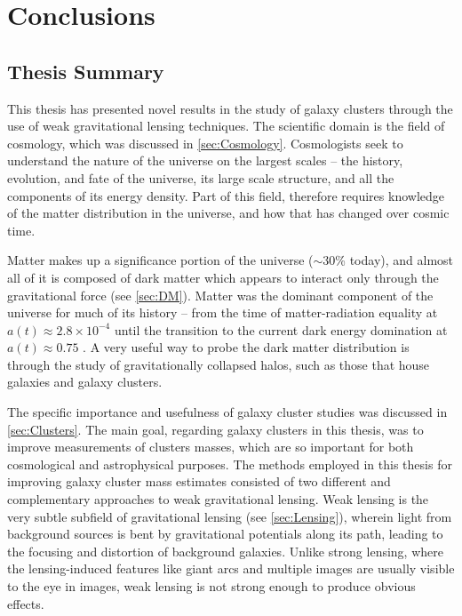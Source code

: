 
\chapter{Conclusions}
\label{ch:conc}


\section{Thesis Summary}
\label{sec:summary}

This thesis has presented novel results in the study of galaxy clusters through the use of weak gravitational lensing techniques. The scientific domain is the field of cosmology, which was discussed in \autoref{sec:Cosmology}. Cosmologists seek to understand the nature of the universe on the largest scales -- the history, evolution, and fate of the universe, its large scale structure, and all the components of its energy density. Part of this field, therefore requires knowledge of the matter distribution in the universe, and how that has changed over cosmic time. 

Matter makes up a significance portion of the universe ($\sim30$\% today), and almost all of it is composed of dark matter which appears to interact only through the gravitational force (see \autoref{sec:DM}). Matter was the dominant component of the universe for much of its history -- from the time of matter-radiation equality at $a(t) \approx 2.8 \times 10^{-4}$ until the transition to the current dark energy domination at $a(t) \approx 0.75$ \citep{RydenText}. A very useful way to probe the dark matter distribution is through the study of gravitationally collapsed halos, such as those that house galaxies and galaxy clusters.

The specific importance and usefulness of galaxy cluster studies was discussed in \autoref{sec:Clusters}. The main goal, regarding galaxy clusters in this thesis, was to improve measurements of clusters masses, which are so important for both cosmological and astrophysical purposes. The methods employed in this thesis for improving galaxy cluster mass estimates consisted of two different and complementary approaches to weak gravitational lensing. Weak lensing is the very subtle subfield of gravitational lensing (see \autoref{sec:Lensing}), wherein light from background sources is bent by gravitational potentials along its path, leading to the focusing and distortion of background galaxies. Unlike strong lensing, where the lensing-induced features like giant arcs and multiple images are usually visible to the eye in images, weak lensing is not strong enough to produce obvious effects.


